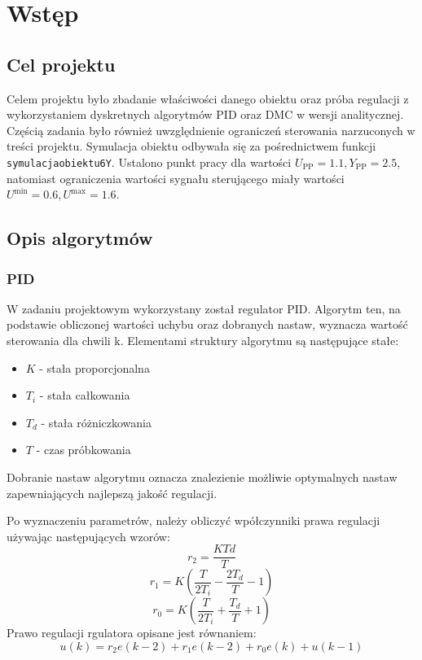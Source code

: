 \chapter{Wstęp}
\section{Cel projektu}
Celem projektu było zbadanie właściwości danego obiektu oraz próba regulacji z wykorzystaniem dyskretnych algorytmów PID oraz DMC w wersji analitycznej. Częścią zadania było również uwzględnienie ograniczeń sterowania narzuconych w treści projektu.
\newline Symulacja obiektu odbywała się za pośrednictwem funkcji \texttt{symulacja\textunderscore obiektu6Y}.
Ustalono punkt pracy dla wartości $U_{\textrm{PP}} = \num{1.1}, Y_{\textrm{PP}} = \num{2.5}$, natomiast ograniczenia wartości sygnału sterującego miały wartości $U^{\textrm{min}} = \num{0.6}, U^{\textrm{max}} = \num{1.6}$.

\section{Opis algorytmów}
\subsection{PID}
W zadaniu projektowym wykorzystany został regulator PID. Algorytm ten, na podstawie obliczonej wartości uchybu oraz dobranych nastaw, wyznacza wartość sterowania dla chwili k. Elementami struktury algorytmu są następujące stałe:
\begin{itemize}
	\item $K$ - stała proporcjonalna
	\item $T_i$ - stała całkowania
	\item $T_d$ - stała różniczkowania
	\item $T$ - czas próbkowania
\end{itemize}

Dobranie nastaw algorytmu oznacza znalezienie możliwie optymalnych nastaw zapewniających najlepszą jakość regulacji.
\par Po wyznaczeniu parametrów, należy obliczyć wpółczynniki prawa regulacji używając następujących wzorów:
\begin{equation}
    r_2 = \frac{KTd}{T}
\end{equation}
\begin{equation}
    r_1 = K(\frac{T}{2T_i}-\frac{2T_d}{T}-1)
\end{equation}
\begin{equation}
    r_0 = K(\frac{T}{2T_i}+\frac{T_d}{T}+1)
\end{equation}
Prawo regulacji rgulatora opisane jest równaniem:
\begin{equation}
    u(k) = r_2e(k-2)+r_1e(k-2)+r_0e(k) +u(k-1)
\end{equation}


